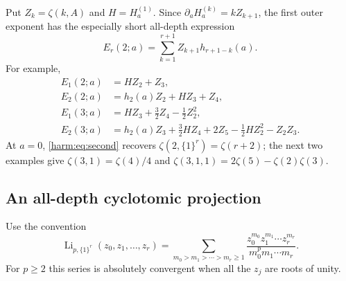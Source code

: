 Put $Z_k=\zeta(k,A)$ and $H=H_a^{(1)}$.  Since
$\partial_a H_a^{(k)}=kZ_{k+1}$, the first outer exponent has the
especially short all-depth expression
\begin{equation}\label{harm:eq:second}
 E_r(2;a)=\sum_{k=1}^{r+1} Z_{k+1}h_{r+1-k}(a).
\end{equation}
For example,
\begin{align}
 E_1(2;a)&=HZ_2+Z_3,\label{harm:eq:examples1}\\
 E_2(2;a)&=h_2(a)Z_2+HZ_3+Z_4,\\
 E_1(3;a)&=HZ_3+\frac32Z_4-\frac12Z_2^2,\\
 E_2(3;a)&=h_2(a)Z_3+\frac32HZ_4+2Z_5
                   -\frac12HZ_2^2-Z_2Z_3.\label{harm:eq:examples4}
\end{align}
At $a=0$, \eqref{harm:eq:second} recovers
$\zeta(2,\{1\}^r)=\zeta(r+2)$; the next two examples give
$\zeta(3,1)=\zeta(4)/4$ and
$\zeta(3,1,1)=2\zeta(5)-\zeta(2)\zeta(3)$.

\subsection{An all-depth cyclotomic projection}

Use the convention
\[
 \operatorname{Li}_{p,\{1\}^r}(z_0,z_1,\ldots,z_r)
 =\sum_{m_0>m_1>\cdots>m_r\geq1}
   \frac{z_0^{m_0}z_1^{m_1}\cdots z_r^{m_r}}
        {m_0^p m_1\cdots m_r}.
\]
For $p\geq2$ this series is absolutely convergent when all the
$z_j$ are roots of unity.

